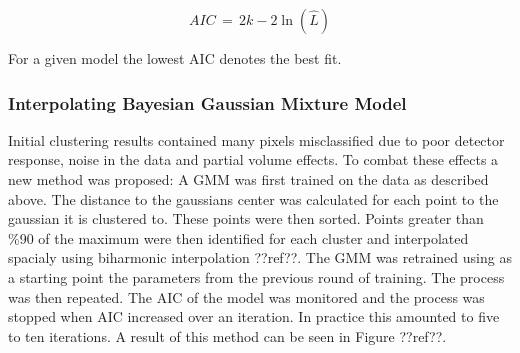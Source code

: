 \documentclass[a4paper,11pt]{article}
\begin{document}
\begin{equation}
    AIC \, = \, 2k - 2\ln(\hat L)
\end{equation}

For a given model the lowest AIC denotes the best fit.

\subsubsection{Interpolating Bayesian Gaussian Mixture Model}

Initial clustering results contained many pixels misclassified due to poor detector response, noise in the data and partial volume effects. To combat these effects a new method was proposed: A GMM was first trained on the data as described above. The distance to the gaussians center was calculated for each point to the gaussian it is clustered to. These points were then sorted. Points greater than \%90 of the maximum were then identified for each cluster and interpolated spacialy using biharmonic interpolation ??ref??. The GMM was retrained using as a starting point the parameters from the previous round of training. The process was then repeated. The AIC of the model was monitored and the process was stopped when AIC increased over an iteration. In practice this amounted to five to ten iterations. A result of this method can be seen in Figure ??ref??.
\end{document}
